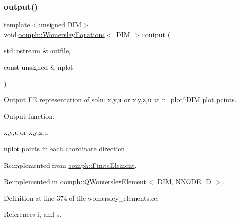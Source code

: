 \mbox{\label{classoomph_1_1WomersleyEquations_acf07411d652b5c2fc16d5dc309eb6ffc}} 
\subsubsection{\texorpdfstring{output()}{output()}\hspace{0.1cm}{\footnotesize\ttfamily [2/4]}}
{\footnotesize\ttfamily template$<$unsigned D\+IM$>$ \\
void \hyperlink{classoomph_1_1WomersleyEquations}{oomph\+::\+Womersley\+Equations}$<$ D\+IM $>$\+::output (\begin{DoxyParamCaption}\item[{std\+::ostream \&}]{outfile,  }\item[{const unsigned \&}]{nplot }\end{DoxyParamCaption})\hspace{0.3cm}{\ttfamily [virtual]}}



Output FE representation of soln\+: x,y,u or x,y,z,u at n\+\_\+plot$^\wedge$\+D\+IM plot points. 

Output function\+:

x,y,u or x,y,z,u

nplot points in each coordinate direction 

Reimplemented from \hyperlink{classoomph_1_1FiniteElement_afa9d9b2670f999b43e6679c9dd28c457}{oomph\+::\+Finite\+Element}.



Reimplemented in \hyperlink{classoomph_1_1QWomersleyElement_a98968ff614577c7796f293cb020831da}{oomph\+::\+Q\+Womersley\+Element$<$ D\+I\+M, N\+N\+O\+D\+E\+\_\+D $>$}.



Definition at line 374 of file womersley\+\_\+elements.\+cc.



References i, and s.

\mbox{\label{classoomph_1_1WomersleyEquations_ab317caeb41aefe218596c1ff1c39d40f}} 
